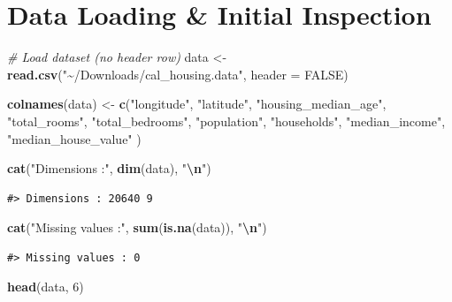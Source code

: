 \documentclass[
]{article}
\newenvironment{Shaded}{\begin{snugshade}}{\end{snugshade}}
\newcommand{\AttributeTok}[1]{\textcolor[rgb]{0.13,0.29,0.53}{#1}}
\newcommand{\CommentTok}[1]{\textcolor[rgb]{0.56,0.35,0.01}{\textit{#1}}}
\newcommand{\ConstantTok}[1]{\textcolor[rgb]{0.56,0.35,0.01}{#1}}
\newcommand{\DecValTok}[1]{\textcolor[rgb]{0.00,0.00,0.81}{#1}}
\newcommand{\FunctionTok}[1]{\textcolor[rgb]{0.13,0.29,0.53}{\textbf{#1}}}
\newcommand{\NormalTok}[1]{#1}
\newcommand{\OtherTok}[1]{\textcolor[rgb]{0.56,0.35,0.01}{#1}}
\newcommand{\SpecialCharTok}[1]{\textcolor[rgb]{0.81,0.36,0.00}{\textbf{#1}}}
\newcommand{\StringTok}[1]{\textcolor[rgb]{0.31,0.60,0.02}{#1}}
\begin{document}
\section{Data Loading \& Initial
Inspection}\label{data-loading-initial-inspection}

\begin{Shaded}
\begin{Highlighting}[]
\CommentTok{\# Load dataset (no header row) }
\NormalTok{data }\OtherTok{\textless{}{-}} \FunctionTok{read.csv}\NormalTok{(}\StringTok{"\textasciitilde{}/Downloads/cal\_housing.data"}\NormalTok{, }\AttributeTok{header =} \ConstantTok{FALSE}\NormalTok{)}


\FunctionTok{colnames}\NormalTok{(data) }\OtherTok{\textless{}{-}} \FunctionTok{c}\NormalTok{(}\StringTok{"longitude"}\NormalTok{, }\StringTok{"latitude"}\NormalTok{, }\StringTok{"housing\_median\_age"}\NormalTok{,}
  \StringTok{"total\_rooms"}\NormalTok{, }\StringTok{"total\_bedrooms"}\NormalTok{, }\StringTok{"population"}\NormalTok{,}
  \StringTok{"households"}\NormalTok{, }\StringTok{"median\_income"}\NormalTok{, }\StringTok{"median\_house\_value"}
\NormalTok{)}


\FunctionTok{cat}\NormalTok{(}\StringTok{"Dimensions :"}\NormalTok{, }\FunctionTok{dim}\NormalTok{(data), }\StringTok{"}\SpecialCharTok{\textbackslash{}n}\StringTok{"}\NormalTok{)}
\end{Highlighting}
\end{Shaded}

\begin{verbatim}
#> Dimensions : 20640 9
\end{verbatim}

\begin{Shaded}
\begin{Highlighting}[]
\FunctionTok{cat}\NormalTok{(}\StringTok{"Missing values :"}\NormalTok{, }\FunctionTok{sum}\NormalTok{(}\FunctionTok{is.na}\NormalTok{(data)), }\StringTok{"}\SpecialCharTok{\textbackslash{}n}\StringTok{"}\NormalTok{)}
\end{Highlighting}
\end{Shaded}

\begin{verbatim}
#> Missing values : 0
\end{verbatim}

\begin{Shaded}
\begin{Highlighting}[]
\FunctionTok{head}\NormalTok{(data, }\DecValTok{6}\NormalTok{)}
\end{Highlighting}
\end{Shaded}
\end{document}
